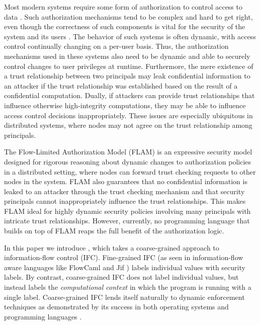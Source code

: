 Most modern systems require some form of authorization to control access to data \cite{Menezes:1996:HAC:548089}. Such authorization mechanisms tend to be complex and hard to get right, even though the correctness of such components is vital for the security of the system and its users \cite{Ferraiolo:1999:RAC:300830.300834}. 
The behavior of such systems is often dynamic, with access control continually changing on a per-user basis. Thus, the authorization mechanisms used in these systems also need to be dynamic and able to securely control changes to user privileges \cite{Ferraiolo:1999:RAC:300830.300834} at runtime. Furthermore, the mere existence of a trust relationship between two principals may leak confidential information to an attacker if the trust relationship was established based on the result of a confidential computation. Dually, if attackers can provide trust relationships that influence otherwise high-integrity computations, they may be able to influence access control decisions inappropriately. These issues are especially ubiquitous in distributed systems, where nodes may not agree on the trust relationship among principals.

The Flow-Limited Authorization Model (FLAM) \cite{Arden:2015:FA:2859845.2859998} is an expressive security model designed for rigorous reasoning about dynamic changes to authorization policies in a distributed setting, where nodes can forward trust checking requests to other nodes in the system. FLAM also guarantees that no confidential information is leaked to an attacker through the trust checking mechanism and that security principals cannot inappropriately influence the trust relationships. This makes FLAM ideal for highly dynamic security policies involving many principals with intricate trust relationships. However, currently, no programming language that builds on top of FLAM reaps the full benefit of the authorization logic.

In this paper we introduce \lang{}, which takes a coarse-grained approach to information-flow control (IFC). Fine-grained IFC (as seen in information-flow aware languages like FlowCaml \cite{Pottier:2003:IFI:596980.596983} and Jif \cite{Myers:1999:JPM:292540.292561}) labels individual values with security labels. By contrast, coarse-grained IFC does not label individual values, but instead labels the \emph{computational context} in which the program is running with a single label. Coarse-grained IFC lends itself naturally to dynamic enforcement techniques as demonstrated by its success in both operating systems \cite{Zeldovich:2006:MIF:1267308.1267327, Zeldovich:2008:SDS:1387589.1387610, Efstathopoulos:2005:LEP:1095810.1095813, Krohn:2007:IFC:1294261.1294293} and programming languages \cite{SRMMlio, Buiras:2015:HMS:2784731.2784758, Stefan:2012:ACT:2364527.2364557, Buiras:2015:DED:2786558.2786563}.

